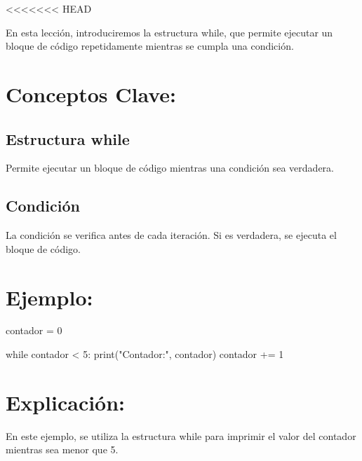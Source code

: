 \documentclass[
  a4paper,
  onepage,
  openany]{scrreprt}
\newenvironment{Shaded}{\begin{snugshade}}{\end{snugshade}}
\newcommand{\BuiltInTok}[1]{\textcolor[rgb]{0.00,0.23,0.31}{#1}}
\newcommand{\ControlFlowTok}[1]{\textcolor[rgb]{0.00,0.23,0.31}{#1}}
\newcommand{\DecValTok}[1]{\textcolor[rgb]{0.68,0.00,0.00}{#1}}
\newcommand{\NormalTok}[1]{\textcolor[rgb]{0.00,0.23,0.31}{#1}}
\newcommand{\OperatorTok}[1]{\textcolor[rgb]{0.37,0.37,0.37}{#1}}
\newcommand{\StringTok}[1]{\textcolor[rgb]{0.13,0.47,0.30}{#1}}
\begin{document}
\textless\textless\textless\textless\textless\textless\textless{} HEAD

En esta lección, introduciremos la estructura while, que permite
ejecutar un bloque de código repetidamente mientras se cumpla una
condición.

\hypertarget{conceptos-clave-36}{%
\section{Conceptos Clave:}\label{conceptos-clave-36}}

\hypertarget{estructura-while}{%
\subsection{Estructura while}\label{estructura-while}}

Permite ejecutar un bloque de código mientras una condición sea
verdadera.

\hypertarget{condiciuxf3n}{%
\subsection{Condición}\label{condiciuxf3n}}

La condición se verifica antes de cada iteración. Si es verdadera, se
ejecuta el bloque de código.

\hypertarget{ejemplo-36}{%
\section{Ejemplo:}\label{ejemplo-36}}

\begin{Shaded}
\begin{Highlighting}[]
\NormalTok{contador }\OperatorTok{=} \DecValTok{0}

\ControlFlowTok{while}\NormalTok{ contador }\OperatorTok{\textless{}} \DecValTok{5}\NormalTok{:}
    \BuiltInTok{print}\NormalTok{(}\StringTok{"Contador:"}\NormalTok{, contador)}
\NormalTok{    contador }\OperatorTok{+=} \DecValTok{1}
\end{Highlighting}
\end{Shaded}

\hypertarget{explicaciuxf3n-36}{%
\section{Explicación:}\label{explicaciuxf3n-36}}

En este ejemplo, se utiliza la estructura while para imprimir el valor
del contador mientras sea menor que 5.
\end{document}
